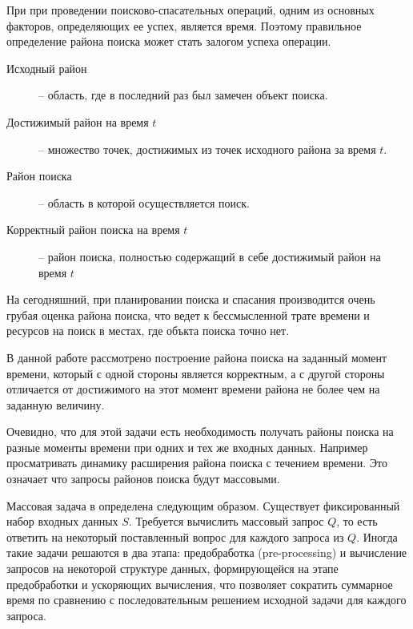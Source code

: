 \startprefacepage

При при проведении поисково-спасательных операций, одним
из основных факторов, определяющих ее успех, является время.
Поэтому правильное определение района поиска может стать залогом
успеха операции.

\begin{description}
\item[Исходный район] -- область, где в последний раз был замечен объект поиска.
\item[Достижимый район на время $t$] -- множество точек, достижимых
из точек исходного района за время $t$.
\item[Район поиска] -- область в которой осуществляется поиск.
\item[Корректный район поиска на время $t$] -- район поиска, полностью
содержащий в себе достижимый район на время $t$
\end{description}

На сегодняшний, при планировании поиска и спасания производится
очень грубая оценка района поиска, что ведет к бессмысленной трате
времени и ресурсов на поиск в местах, где объкта поиска точно нет.

В данной работе рассмотрено построение района поиска на заданный
момент времени, который с одной стороны является корректным,
а с другой стороны отличается от достижимого на этот момент
времени района не более чем на заданную величину.

Очевидно, что для этой задачи есть необходимость получать
районы поиска на разные моменты времени при одних и тех же
входных данных. Например просматривать динамику расширения района
поиска с течением времени. Это означает что запросы
районов поиска будут массовыми.

Массовая задача в \cite{PrSh} определена следующим образом. Существует
фиксированный набор входных данных $S$. Требуется вычислить массовый
запрос $Q$, то есть ответить на некоторый поставленный вопрос для каждого
запроса из $Q$. Иногда такие задачи решаются в два этапа: предобработка
(pre-processing) и вычисление запросов на некоторой структуре данных,
формирующейся на этапе предобработки и ускоряющих вычисления, что позволяет
сократить суммарное время по сравнению с последовательным решением
исходной задачи для каждого запроса.

